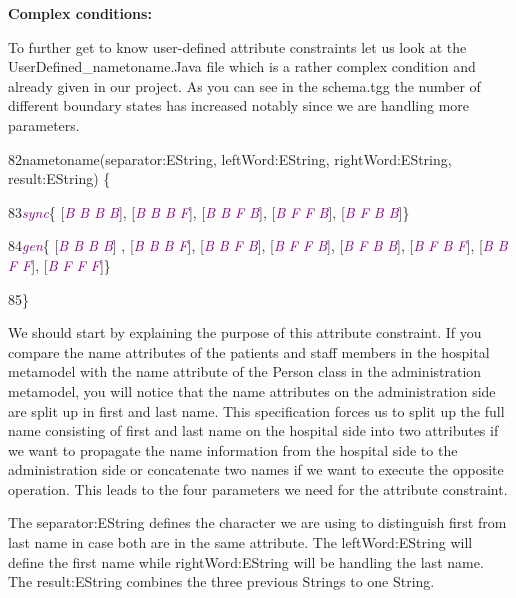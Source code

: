 {\clearpage

\textbf{Complex conditions:}

To further get to know user-defined attribute constraints let us look at the \textsf{UserDefined\_nametoname.Java} file which is a rather complex condition and already given in our project. As you can see in the schema.tgg the number of different boundary states has increased notably since we are handling more parameters. \newline

{

82\hspace{0.45cm}nametoname(separator:EString, leftWord:EString, rightWord:EString, result:EString) \{

83\hspace{1cm}\textcolor{Purple}{\textit{sync}}\{ [\textcolor{Purple}{\textit{B B B B}}], [\textcolor{Purple}{\textit{B B B F}}], [\textcolor{Purple}{\textit{B B F B}}], [\textcolor{Purple}{\textit{B F F B}}], [\textcolor{Purple}{\textit{B F B B}}]\}
		
84\hspace{1cm}\textcolor{Purple}{\textit{gen}}\{ [\textcolor{Purple}{\textit{B B B B}}] , [\textcolor{Purple}{\textit{B B B F}}], [\textcolor{Purple}{\textit{B B F B}}], [\textcolor{Purple}{\textit{B F F B}}], [\textcolor{Purple}{\textit{B F B B}}], [\textcolor{Purple}{\textit{B F B F}}], [\textcolor{Purple}{\textit{B B F F}}], [\textcolor{Purple}{\textit{B F F F}}]\}

85\hspace{0.45cm}\} \newline
	
}

We should start by explaining the purpose of this attribute constraint. If you compare the name attributes of the patients and staff members in the hospital metamodel with the name attribute of the Person class in the administration metamodel, you will notice that the name attributes on the administration side are split up in first and last name. This specification forces us to split up the full name consisting of first and last name on the hospital side into two attributes if we want to propagate the name information from the hospital side to the administration side or concatenate two names if we want to execute the opposite operation. This leads to the four parameters we need for the attribute constraint.

The \textsf{separator:EString} defines the character we are using to distinguish first from last name in case both are in the same attribute. The \textsf{leftWord:EString} will define the first name while \textsf{rightWord:EString} will be handling the last name. The \textsf{result:EString} combines the three previous Strings to one String. \newline

}
